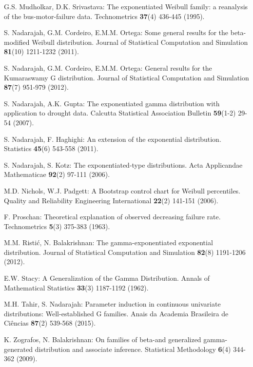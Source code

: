 \documentclass[12pt,a4paper]{article} %
\begin{document}
\begin{description}
\item
G.S. Mudholkar, D.K. Srivastava:
The exponentiated Weibull family: a reanalysis of the bus-motor-failure data.
Technometrics {\bf 37}(4) 436-445 (1995).

\item
S. Nadarajah, G.M. Cordeiro, E.M.M. Ortega:
Some general results for the beta-modified Weibull distribution.
Journal of Statistical Computation and Simulation {\bf 81}(10) 1211-1232 (2011).

\item
S. Nadarajah, G.M. Cordeiro, E.M.M. Ortega:
General results for the Kumaraswamy G distribution.
Journal of Statistical Computation and Simulation {\bf 87}(7) 951-979 (2012).

\item
S. Nadarajah, A.K. Gupta:
The exponentiated gamma distribution with application to drought data.
Calcutta Statistical Association Bulletin {\bf 59}(1-2) 29-54 (2007).

\item
S. Nadarajah, F. Haghighi:
An extension of the exponential distribution.
Statistics {\bf 45}(6) 543-558 (2011).

\item
S. Nadarajah, S. Kotz:
The exponentiated-type distributions.
Acta Applicandae Mathematicae {\bf 92}(2) 97-111 (2006).

\item
M.D. Nichols, W.J. Padgett:
A Bootstrap control chart for Weibull percentiles.
Quality and Reliability Engineering International {\bf 22}(2) 141-151 (2006).

\item
F. Proschan:
Theoretical explanation of observed decreasing failure rate.
Technometrics {\bf 5}(3) 375-383 (1963).

\item
M.M. Risti\'{c}, N. Balakrishnan:
The gamma-exponentiated exponential distribution.
Journal of Statistical Computation and Simulation {\bf 82}(8) 1191-1206 (2012).

\item
E.W. Stacy: A Generalization of the Gamma Distribution. Annals of Mathematical Statistics {\bf 33}(3) 1187-1192 (1962).

\item
M.H. Tahir, S. Nadarajah:
Parameter induction in continuous univariate distributions: Well-established G families.
Anais da Academia Brasileira de Ci\^{e}ncias {\bf 87}(2) 539-568 (2015).

\item
K. Zografos, N. Balakrishnan:
On families of beta-and generalized gamma-generated distribution and
associate inference.  Statistical Methodology {\bf 6}(4) 344-362 (2009).

\end{description}
\end{document}
